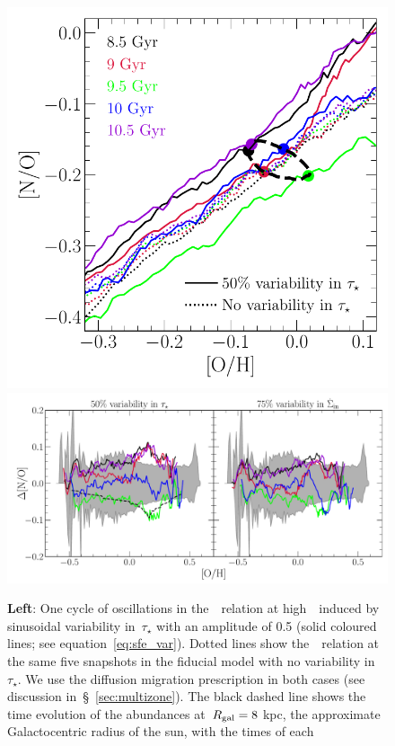 \documentclass[ms.tex]{subfiles}
\begin{document}
\begin{figure}
\centering
\includegraphics[scale = 0.44]{no_oh_sfevar.pdf}
\includegraphics[scale = 0.47]{delta_no_schaefercomp.pdf}
\caption{
\textbf{Left}: One cycle of oscillations in the~\ohno~relation at
high~\oh~induced by sinusoidal variability in~$\tau_\star$ with an amplitude of
0.5 (solid coloured lines; see equation~\ref{eq:sfe_var}).
Dotted lines show the~\ohno~relation at the same five snapshots in the fiducial
model with no variability in~$\tau_\star$.
We use the diffusion migration prescription in both cases (see discussion
in~\S~\ref{sec:multizone}).
The black dashed line shows the time evolution of the abundances at~$R_\text{gal} = 8$
kpc, the approximate Galactocentric radius of the sun, with the times of each
}
\end{figure}
\end{document}

